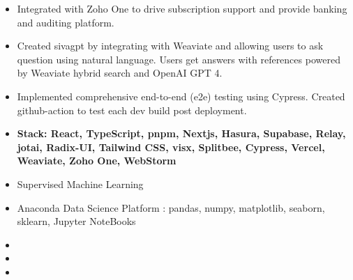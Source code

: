 \documentclass[10pt,a4paper,ragged2e,withhyper]{altacv}
\begin{document}
\begin{paracol}{2}
\begin{itemize}
\item Integrated with Zoho One to drive subscription support and provide banking and auditing platform.
\item Created sivagpt by integrating with Weaviate and allowing users to ask question using natural language.
      Users get answers with references powered by Weaviate hybrid search and OpenAI GPT 4.
\item Implemented comprehensive end-to-end (e2e) testing using Cypress. Created github-action to test each dev build post deployment.
\item \textbf{Stack: React, TypeScript, pnpm, Nextjs, Hasura, Supabase, Relay, jotai, Radix-UI, Tailwind CSS, visx, Splitbee, Cypress, Vercel, Weaviate, Zoho One, WebStorm}
\end{itemize}

\bigskip

\medskip
{}
\begin{itemize}
\smallskip
\item Supervised Machine Learning
\item Anaconda Data Science Platform : pandas, numpy, matplotlib, seaborn, sklearn, Jupyter NoteBooks
\end{itemize}


\bigskip
{}
\begin{itemize}
\item{}
\smallskip
\item{}
\smallskip
\item{}
\end{itemize}










\end{paracol}
\end{document}
